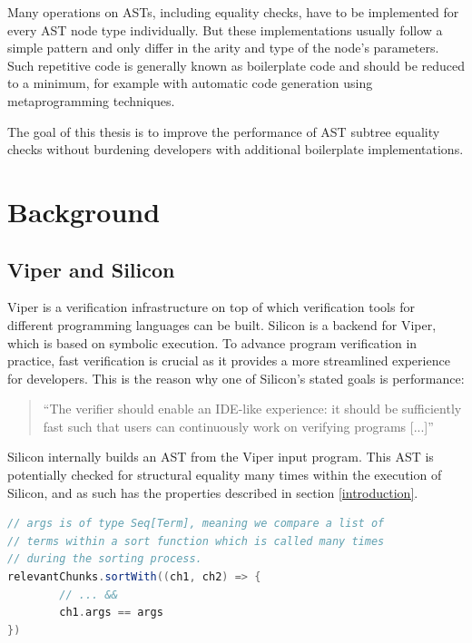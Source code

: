 \documentclass[11pt]{article}
\begin{document}
    Many operations on ASTs, including equality checks, have to be implemented for
    every AST node type individually. But these implementations usually follow a simple
    pattern and only differ in the arity and type of the node's parameters. Such repetitive
    code is generally known as boilerplate code and should be reduced to a minimum, for example
    with automatic code generation using metaprogramming techniques.

    The goal of this thesis is to improve the performance of AST subtree equality checks
    without burdening developers with additional boilerplate implementations.
    
    \section{Background}

    \subsection{Viper and Silicon} \label{background:viper}
    
    Viper \cite{viper} is a verification infrastructure on top of which verification tools
    for different programming languages can be built. Silicon \cite{silicon} is a backend for Viper,
    which is based on symbolic execution. To advance program verification in practice,
    fast verification is crucial as it provides a more streamlined experience for developers.
    This is the reason why one of Silicon's stated goals is performance:

    \begin{quote} 
        ``The verifier should enable an IDE-like experience: it should be
        sufficiently fast such that users can continuously work on verifying
        programs [...]'' \cite{silicon}
    \end{quote}

    Silicon internally builds an AST from the Viper input
    program. This AST is potentially checked for structural equality many times within
    the execution of Silicon, and as such has the properties described in section \ref{introduction}.

    \begin{lstlisting}[language=Scala, caption=Example of multiple subtree (``term'') equality checks occuring during the execution of Silicon.]
// args is of type Seq[Term], meaning we compare a list of
// terms within a sort function which is called many times
// during the sorting process.
relevantChunks.sortWith((ch1, ch2) => {
        // ... &&
        ch1.args == args
})
    \end{lstlisting}
\end{document}

